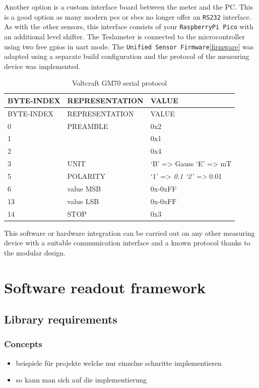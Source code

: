 Another option is a custom interface board between the meter and the PC.
This is a good option as many modern \gls{pc}s or \gls{sbc}s no longer
offer an \passthrough{\lstinline!RS232!} interface. As with the other
sensors, this interface consists of your
\passthrough{\lstinline!RaspberryPi Pico!} with an additional level
shifter. The Teslameter is connected to the microcontroller using two
free \gls{gpio}s in \gls{uart} mode. The
\passthrough{\lstinline!Unified Sensor Firmware!}\ref{firmware} was
adapted using a separate build configuration and the protocol of the
measuring device was implemented.

\begin{longtable}[]{@{}lll@{}}
\caption{Voltcraft GM70 serial protocol
\label{Voltcraft_GM70_serial_protocol.csv}}\tabularnewline
\toprule
BYTE-INDEX & REPRESENTATION & VALUE\tabularnewline
\midrule
\endfirsthead
\toprule
BYTE-INDEX & REPRESENTATION & VALUE\tabularnewline
\midrule
\endhead
0 & PREAMBLE & 0x2\tabularnewline
1 & & 0x1\tabularnewline
2 & & 0x4\tabularnewline
3 & UNIT & `B' =\textgreater{} Gauss `E' =\textgreater{}
mT\tabularnewline
5 & POLARITY & `1' =\textgreater{} \emph{0.1 `2' =\textgreater{}
}0.01\tabularnewline
6 & value MSB & 0x-0xFF\tabularnewline
13 & value LSB & 0x-0xFF\tabularnewline
14 & STOP & 0x3\tabularnewline
\bottomrule
\end{longtable}

This software or hardware integration can be carried out on any other
measuring device with a suitable communication interface and a known
protocol thanks to the modular design.

\hypertarget{software-readout-framework}{%
\chapter{Software readout framework}\label{software-readout-framework}}

\hypertarget{library-requirements}{%
\section{Library requirements}\label{library-requirements}}

\hypertarget{concepts}{%
\subsection{Concepts}\label{concepts}}

\begin{itemize}
\tightlist
\item
  beispiele für projekte welche nur einzelne schnritte implementieren
\item
  so kann man sich auf die implementierung
\end{itemize}

